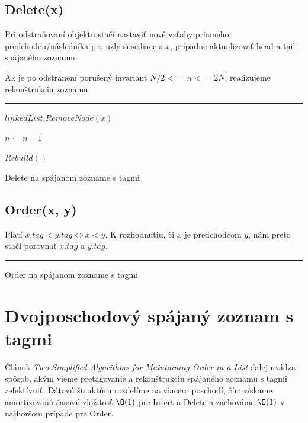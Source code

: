 \documentclass[
  digital,     %
  oneside,     %
  nosansbold,  %
  nocolorbold, %
  lof,         %
  lot,         %
]{fithesis4}
\begin{document}
\section{Delete(x)}
Pri odstraňovaní objektu stačí nastaviť nové vzťahy priameho predchodcu/následníka pre uzly susediace s $x$, prípadne aktualizovať head a tail spájaného zoznamu.

Ak je po odstránení porušený invariant $N/2 <= n <= 2N$, realizujeme rekonštrukciu zoznamu.

\begin{algorithm}
\hrule\vspace{0.2em}

$linkedList.RemoveNode(x)$

$n \leftarrow n - 1$\;

{
    $Rebuild()$\;
}
\caption{Delete na spájanom zozname s tagmi}
\end{algorithm}

\section{Order(x, y)}
Platí $x.tag < y.tag \iff x < y$. 
K rozhodnutiu, či $x$ je predchodcom $y$, nám preto stačí porovnať  $x.tag$ a $y.tag$.

\begin{algorithm}
\hrule\vspace{0.2em}
\;
\caption{Order na spájanom zozname s tagmi}
\end{algorithm}

\chapter{Dvojposchodový spájaný zoznam s tagmi}
Článok \textit{Two Simplified Algorithms for Maintaining Order in a List} \cite{paper1_ordered_list} ďalej uvádza spôsob, akým vieme pretagovanie a rekonštrukciu spájaného zoznamu s tagmi zefektívniť. Dátovú štruktúru rozdelíme na viacero poschodí, čím získame amortizovanú časovú zložitosť $\O(1)$ pre Insert a Delete a zachováme $\O(1)$ v najhoršom prípade pre Order.
\end{document}
